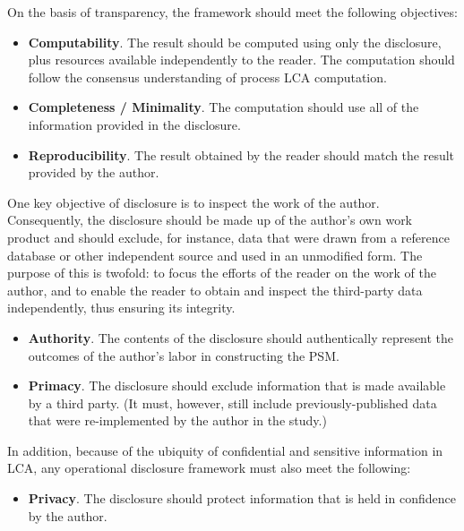 On the basis of transparency, the framework should meet the following objectives:
\begin{itemize}
\item \textbf{Computability}. The result should be computed using only the disclosure, plus resources available independently to the reader.  The computation should follow the consensus understanding of process LCA computation.
\item \textbf{Completeness / Minimality}.  The computation should use all of the information provided in the disclosure.
\item \textbf{Reproducibility}.  The result obtained by the reader should match the result provided by the author.
\end{itemize}
One key objective of disclosure is to inspect the work of the author.  Consequently, the disclosure should be made up of the author's own work product and should exclude, for instance, data that were drawn from a reference database or other independent source and used in an unmodified form.  The purpose of this is twofold: to focus the efforts of the reader on the work of the author, and to enable the reader to obtain and inspect the third-party data independently, thus ensuring its integrity.
\begin{itemize}
\item \textbf{Authority}.  The contents of the disclosure should authentically represent the outcomes of the author's labor in constructing the PSM.
\item \textbf{Primacy}.  The disclosure should exclude information that is made available by a third party.  (It must, however, still include previously-published data that were re-implemented by the author in the study.)
\end{itemize}
In addition, because of the ubiquity of confidential and sensitive information in LCA, any operational disclosure framework must also meet the following:
\begin{itemize}
\item \textbf{Privacy}.  The disclosure should protect information that is held in confidence by the author.
\end{itemize}

\endinput




